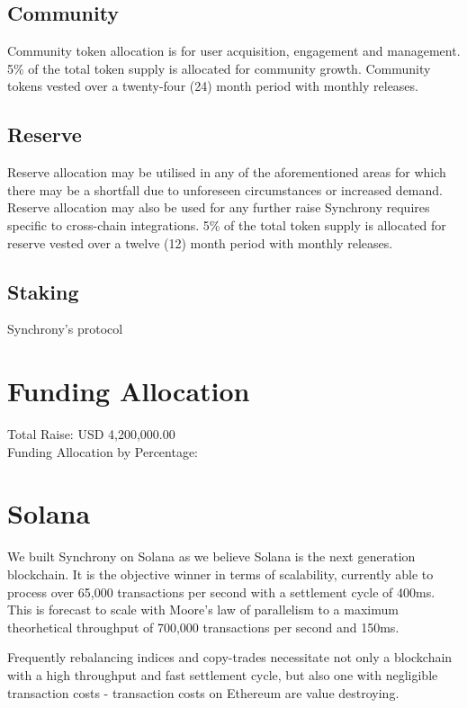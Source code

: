 \documentclass[10pt]{article}
\begin{document}
					\subsection{Community}
					Community token allocation is for user acquisition, engagement and management.
					5\% of the total token supply is allocated for community growth. Community
					tokens vested over a twenty-four (24) month period with monthly releases.

					\subsection{Reserve}
					Reserve allocation may be utilised in any of the aforementioned areas for which
					there may be a shortfall due to unforeseen circumstances or increased demand.
					Reserve allocation may also be used for any further raise Synchrony requires
					specific to cross-chain integrations. 5\% of the total token supply is allocated
					for reserve vested over a twelve (12) month period with monthly releases.

					\subsection{Staking}
					Synchrony's protocol

					\section{Funding Allocation}
					Total Raise: USD 4,200,000.00\\
					Funding Allocation by Percentage:

					\section{Solana}
					We built Synchrony on Solana as we believe Solana is the next generation
					blockchain. It is the objective winner in terms of scalability, currently able
					to process over 65,000 transactions per second with a settlement cycle of 400ms.
					This is forecast to scale with Moore's law of parallelism to a maximum
					theorhetical throughput of 700,000 transactions per second and 150ms.

					Frequently rebalancing indices and copy-trades necessitate not only a blockchain
					with a high throughput and fast settlement cycle, but also one with negligible
					transaction costs - transaction costs on Ethereum are value destroying.
\end{document}
